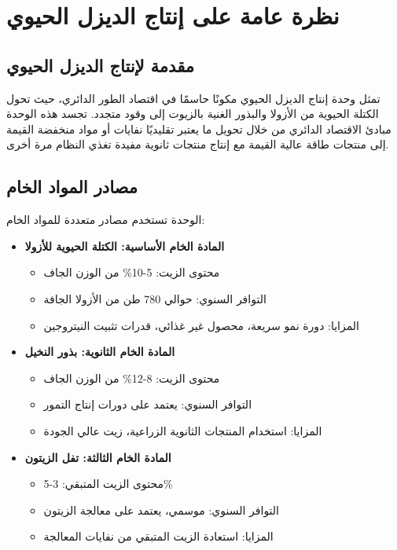 \section{نظرة عامة على إنتاج الديزل الحيوي}

\subsection{مقدمة لإنتاج الديزل الحيوي}

تمثل وحدة إنتاج الديزل الحيوي مكونًا حاسمًا في اقتصاد الطور الدائري، حيث تحول الكتلة الحيوية من الأزولا والبذور الغنية بالزيوت إلى وقود متجدد. تجسد هذه الوحدة مبادئ الاقتصاد الدائري من خلال تحويل ما يعتبر تقليديًا نفايات أو مواد منخفضة القيمة إلى منتجات طاقة عالية القيمة مع إنتاج منتجات ثانوية مفيدة تغذي النظام مرة أخرى.

\subsection{مصادر المواد الخام}

الوحدة تستخدم مصادر متعددة للمواد الخام:

\begin{itemize}
    \item \textbf{المادة الخام الأساسية: الكتلة الحيوية للأزولا}
    \begin{itemize}
        \item محتوى الزيت: 5-10\% من الوزن الجاف
        \item التوافر السنوي: حوالي 780 طن من الأزولا الجافة
        \item المزايا: دورة نمو سريعة، محصول غير غذائي، قدرات تثبيت النيتروجين
    \end{itemize}
    
    \item \textbf{المادة الخام الثانوية: بذور النخيل}
    \begin{itemize}
        \item محتوى الزيت: 8-12\% من الوزن الجاف
        \item التوافر السنوي: يعتمد على دورات إنتاج التمور
        \item المزايا: استخدام المنتجات الثانوية الزراعية، زيت عالي الجودة
    \end{itemize}
    
    \item \textbf{المادة الخام الثالثة: تفل الزيتون}
    \begin{itemize}
        \item محتوى الزيت المتبقي: 3-5\%
        \item التوافر السنوي: موسمي، يعتمد على معالجة الزيتون
        \item المزايا: استعادة الزيت المتبقي من نفايات المعالجة
    \end{itemize}
\end{itemize}


